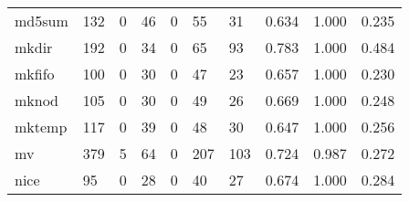 \begin{longtable}{lp{2.0cm}p{2.0cm}p{2.0cm}p{2.0cm}p{2.0cm}p{2.0cm}p{2.0cm}p{2.0cm}p{2.0cm}}
md5sum    &                    132 &                                  0 &                                46 &                                0 &                                55 &                              31 &                                0.634 &                                  1.000 &                                0.235 \\
mkdir     &                    192 &                                  0 &                                34 &                                0 &                                65 &                              93 &                                0.783 &                                  1.000 &                                0.484 \\
mkfifo    &                    100 &                                  0 &                                30 &                                0 &                                47 &                              23 &                                0.657 &                                  1.000 &                                0.230 \\
mknod     &                    105 &                                  0 &                                30 &                                0 &                                49 &                              26 &                                0.669 &                                  1.000 &                                0.248 \\
mktemp    &                    117 &                                  0 &                                39 &                                0 &                                48 &                              30 &                                0.647 &                                  1.000 &                                0.256 \\
mv        &                    379 &                                  5 &                                64 &                                0 &                               207 &                             103 &                                0.724 &                                  0.987 &                                0.272 \\
nice      &                     95 &                                  0 &                                28 &                                0 &                                40 &                              27 &                                0.674 &                                  1.000 &                                0.284 \\

\end{longtable}
